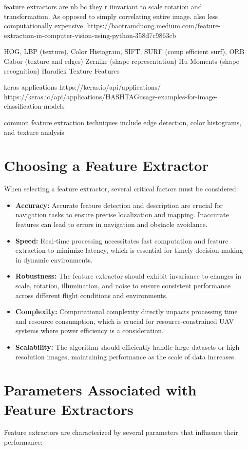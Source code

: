 feature extractors are nb bc they r iinvariant to scale rotation and transformation. As opposed to simply correlating entire image. also less computationally expensive.
https://baotramduong.medium.com/feature-extraction-in-computer-vision-using-python-358d7c9863cb

HOG, LBP (texture), Color Histogram, 
SIFT, SURF (comp efficient surf), ORB 
Gabor (texture and edges)
Zernike  (shape representation)
Hu Moments (shape recognition)
Haralick Texture Features

keras applications
https://keras.io/api/applications/
https://keras.io/api/applications/HASHTAGusage-examples-for-image-classification-models

common feature extraction techniques include edge detection, color histograms, and texture analysis



\section{Choosing a Feature Extractor}
When selecting a feature extractor, several critical factors must be considered:
\begin{itemize}
    \item \textbf{Accuracy:} Accurate feature detection and description are crucial for navigation tasks to ensure precise localization and mapping. Inaccurate features can lead to errors in navigation and obstacle avoidance.
    \item \textbf{Speed:} Real-time processing necessitates fast computation and feature extraction to minimize latency, which is essential for timely decision-making in dynamic environments.
    \item \textbf{Robustness:} The feature extractor should exhibit invariance to changes in scale, rotation, illumination, and noise to ensure consistent performance across different flight conditions and environments.
    \item \textbf{Complexity:} Computational complexity directly impacts processing time and resource consumption, which is crucial for resource-constrained UAV systems where power efficiency is a consideration.
    \item \textbf{Scalability:} The algorithm should efficiently handle large datasets or high-resolution images, maintaining performance as the scale of data increases.
\end{itemize}

\section{Parameters Associated with Feature Extractors}
Feature extractors are characterized by several parameters that influence their performance:

